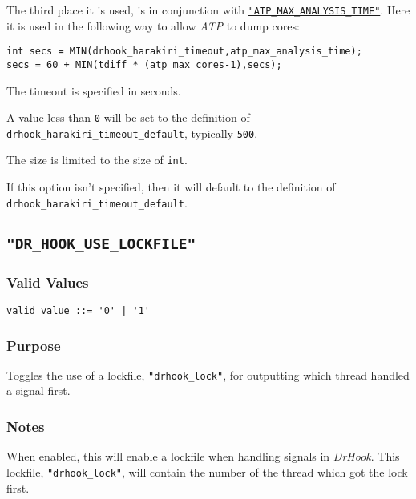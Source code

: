 The third place it is used, is in conjunction with \hyperref[section:flags:ATP_MAX_ANALYSIS_TIME]{\texttt{"ATP\_MAX\_ANALYSIS\_TIME"}}. Here it is used in the following way to allow \textit{ATP} to dump cores:

\verb|int secs = MIN(drhook_harakiri_timeout,atp_max_analysis_time);|\\
\verb|secs = 60 + MIN(tdiff * (atp_max_cores-1),secs);|

The timeout is specified in seconds.

A value less than \verb|0| will be set to the definition of \verb|drhook_harakiri_timeout_default|, typically \verb|500|.

The size is limited to the size of \verb|int|.

If this option isn't specified, then it will default to the definition of \verb|drhook_harakiri_timeout_default|.



\subsection{\texttt{"DR\_HOOK\_USE\_LOCKFILE"}}
\label{section:flags:DR_HOOK_USE_LOCKFILE}
\vspace{-2ex}
\subsubsection{Valid Values}
\vspace{-2ex}
\verb+valid_value ::= '0' | '1'+ 

\vspace{-2ex}
\subsubsection{Purpose}
\vspace{-2ex}
Toggles the use of a lockfile, \verb|"drhook_lock"|, for outputting which thread handled a signal first.

\vspace{-2ex}
\subsubsection{Notes}
\vspace{-2ex}
When enabled, this will enable a lockfile when handling signals in \textit{DrHook}. This lockfile, \verb|"drhook_lock"|, will contain the number of the thread which got the lock first.

